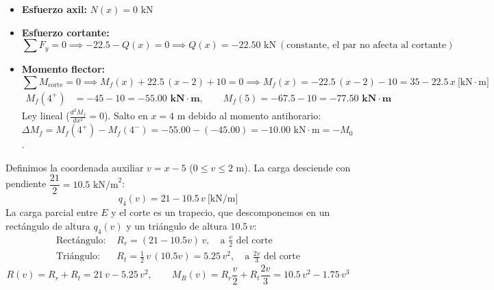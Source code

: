 \begin{itemize}
    \item \textbf{Esfuerzo axil:} $\boxed{N(x) = 0\text{ kN}}$
    \item \textbf{Esfuerzo cortante:}
          \begin{equation}
              \sum F_y = 0 \implies -22.5 - Q(x) = 0 \implies \boxed{Q(x) = -22.50\text{ kN}} \ (\text{constante, el par no afecta al cortante})
          \end{equation}
    \item \textbf{Momento flector:}
          \begin{equation}
              \sum M_{\text{corte}} = 0 \implies M_f(x) + 22.5\,(x - 2) + 10 = 0 \implies \boxed{M_f(x) = -22.5\,(x-2) - 10 = 35 - 22.5\,x \ \text{[kN}\cdot\text{m]}}
          \end{equation}
          \begin{align*}
              M_f(4^+) & = -45 - 10 = \mathbf{-55.00\text{ kN}\cdot\text{m}}, \qquad M_f(5) = -67.5 - 10 = \mathbf{-77.50\text{ kN}\cdot\text{m}}
          \end{align*}
          Ley lineal ($\tfrac{d^2M_f}{dx^2} = 0$). Salto en $x = 4\text{ m}$ debido al momento antihorario: $\Delta M_f = M_f(4^+) - M_f(4^-) = -55.00 - (-45.00) = -10.00\text{ kN}\cdot\text{m} = -M_0$.
\end{itemize}


Definimos la coordenada auxiliar $v = x - 5$ ($0 \le v \le 2\text{ m}$). La carga desciende con pendiente $\dfrac{21}{2} = 10.5\text{ kN/m}^2$:
\begin{equation}
    q_4(v) = 21 - 10.5\,v \ \text{[kN/m]}
\end{equation}
La carga parcial entre $E$ y el corte es un trapecio, que descomponemos en un rectángulo de altura $q_4(v)$ y un triángulo de altura $10.5\,v$:
\begin{align*}
    \text{Rectángulo: } & R_r = (21 - 10.5v)\,v, \quad \text{a } \tfrac{v}{2} \text{ del corte}                       \\
    \text{Triángulo: }  & R_t = \tfrac{1}{2}\,v\,(10.5v) = 5.25\,v^2, \quad \text{a } \tfrac{2v}{3} \text{ del corte}
\end{align*}
\begin{equation}
    R(v) = R_r + R_t = 21\,v - 5.25\,v^2, \qquad M_R(v) = R_r\frac{v}{2} + R_t\frac{2v}{3} = 10.5\,v^2 - 1.75\,v^3
\end{equation}

